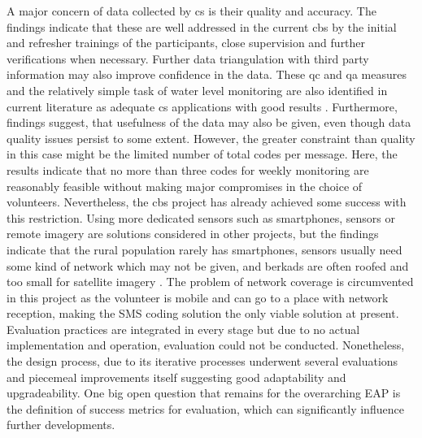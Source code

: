 A major concern of data collected by \acrshort{cs} is their quality and accuracy. The findings indicate that these are well addressed in the current \acrshort{cbs} by the initial and refresher trainings of the participants, close supervision and further verifications when necessary. Further data triangulation with third party information may also improve confidence in the data. These \acrshort{qc} and \acrshort{qa} measures and the relatively simple task of water level monitoring are also identified in current literature as adequate \acrshort{cs} applications with good results \autocite{albusAccuracyLongtermVolunteer2020,baalbakiCitizenScienceLebanon2019,fraislCitizenScienceEnvironmental2022}. Furthermore, \autocite{aceves-buenoCitizenScienceApproach2015} findings suggest, that usefulness of the data may also be given, even though data quality issues persist to some extent. However, the greater constraint than quality in this case might be the limited number  of total codes per message. Here, the results indicate that no more than three codes for weekly monitoring are reasonably feasible without making major compromises in the choice of volunteers. Nevertheless, the \acrshort{cbs} project has already achieved some success with this restriction.\newline
Using more dedicated sensors such as smartphones, sensors or remote imagery are solutions considered in other projects, but the findings indicate that the rural population rarely has smartphones, sensors usually need some kind of network which may not be given, and berkads are often roofed and too small for satellite imagery \autocite{bartramGlobalMonitoringWater2014,klemasUsingRemoteSensing2015,maoMovingTechnologySociotechnical2020,masindeITIKIMobileBased2019,mcneilLandscapeParticipatorySurveillance2022a,senayEstablishingOperationalWaterhole2013,thomsonRemoteMonitoringRural2021}. The problem of network coverage is circumvented in this project as the volunteer is mobile and can go to a place with network reception, making the SMS coding solution the only viable solution at present.\newline
Evaluation practices are integrated in every stage but due to no actual implementation and operation, evaluation could not be conducted. Nonetheless, the design process, due to its iterative processes underwent several evaluations and piecemeal improvements itself suggesting good adaptability and upgradeability. One big open question that remains for the overarching EAP is the definition of success metrics for evaluation, which can significantly influence further developments.\newline

